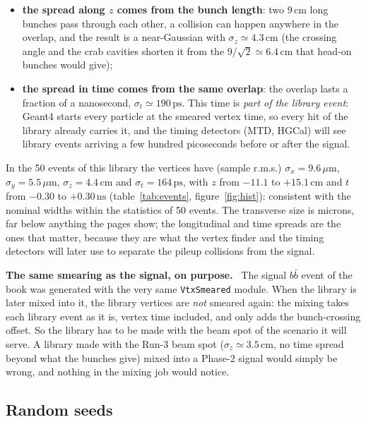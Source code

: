 \documentclass[11pt,a4paper]{article}
\newcommand{\code}[1]{\texttt{#1}}
\newcommand{\bbbar}{\ensuremath{b\bar{b}}}
\newcommand{\ns}{\,\mathrm{ns}}
\newcommand{\ps}{\,\mathrm{ps}}
\newcommand{\cm}{\,\mathrm{cm}}
\newcommand{\um}{\,\mu\mathrm{m}}
\newenvironment{plainwords}[1][In plain words]{%
  \par\medskip\noindent\setlength{\fboxsep}{6pt}\setlength{\fboxrule}{0.6pt}%
  \begin{lrbox}{\plainbox}\begin{minipage}{\dimexpr\textwidth-2\fboxsep-2\fboxrule\relax}\small
  \textbf{\textcolor{plainrule}{#1.}}\ \ignorespaces}{%
  \end{minipage}\end{lrbox}\noindent\fcolorbox{plainrule}{plainbg}{\usebox{\plainbox}}\par\medskip}
\begin{document}
\begin{itemize}
\item \textbf{the spread along $z$ comes from the bunch length}: two $9\cm$ long bunches pass through
  each other, a collision can happen anywhere in the overlap, and the result is a near-Gaussian with
  $\sigma_z\simeq4.3\cm$ (the crossing angle and the crab cavities shorten it from the
  $9/\sqrt{2}\simeq6.4\cm$ that head-on bunches would give);
\item \textbf{the spread in time comes from the same overlap}: the overlap lasts a fraction of a nanosecond,
  $\sigma_t\simeq190\ps$. This time is \emph{part of the library event}: Geant4 starts every particle at the
  smeared vertex time, so every hit of the library already carries it, and the timing detectors (MTD, HGCal)
  will see library events arriving a few hundred picoseconds before or after the signal.
\end{itemize}
In the 50 events of this library the vertices have (sample r.m.s.) $\sigma_x = 9.6\um$,
$\sigma_y = 5.5\um$, $\sigma_z = 4.4\cm$ and $\sigma_t = 164\ps$, with $z$ from $-11.1$ to $+15.1\cm$ and $t$
from $-0.30$ to $+0.30\ns$ (table~\ref{tab:events}, figure~\ref{fig:hist}): consistent with the nominal
widths within the statistics of 50 events. The transverse size is microns, far below anything the pages
show; the longitudinal and time spreads are the ones that matter, because they are what the vertex finder
and the timing detectors will later use to separate the pileup collisions from the signal.

\begin{plainwords}[The same smearing as the signal, on purpose]
The signal \bbbar{} event of the book was generated with the very same \code{VtxSmeared} module. When the
library is later mixed into it, the library vertices are \emph{not} smeared again: the mixing takes each
library event as it is, vertex time included, and only adds the bunch-crossing offset. So the library has to
be made with the beam spot of the scenario it will serve. A library made with the Run-3 beam spot
($\sigma_z\simeq3.5\cm$, no time spread beyond what the bunches give) mixed into a Phase-2 signal would
simply be wrong, and nothing in the mixing job would notice.
\end{plainwords}

\subsection{Random seeds}
\label{sec:seeds}
\end{document}
